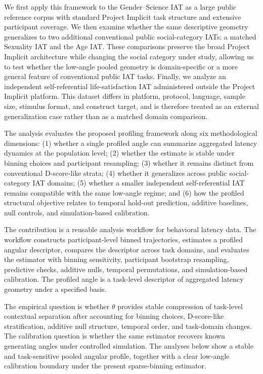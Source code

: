 \documentclass[12pt]{article}
\begin{document}
We first apply this framework to the Gender--Science IAT as a large public reference corpus with standard Project Implicit task structure and extensive participant coverage. We then examine whether the same descriptive geometry generalizes to two additional conventional public social-category IATs: a matched Sexuality IAT and the Age IAT. These comparisons preserve the broad Project Implicit architecture while changing the social category under study, allowing us to test whether the low-angle pooled geometry is domain-specific or a more general feature of conventional public IAT tasks. Finally, we analyze an independent self-referential life-satisfaction IAT administered outside the Project Implicit platform. This dataset differs in platform, protocol, language, sample size, stimulus format, and construct target, and is therefore treated as an external generalization case rather than as a matched domain comparison.

The analysis evaluates the proposed profiling framework along six methodological dimensions: (1) whether a single profiled angle can summarize aggregated latency dynamics at the population level; (2) whether the estimate is stable under binning choices and participant resampling; (3) whether it remains distinct from conventional D-score-like strata; (4) whether it generalizes across public social-category IAT domains; (5) whether a smaller independent self-referential IAT remains compatible with the same low-angle regime; and (6) how the profiled structural objective relates to temporal hold-out prediction, additive baselines, null controls, and simulation-based calibration.

The contribution is a reusable analysis workflow for behavioral latency data. The workflow constructs participant-level binned trajectories, estimates a profiled angular descriptor, compares the descriptor across task domains, and evaluates the estimator with binning sensitivity, participant bootstrap resampling, predictive checks, additive nulls, temporal permutations, and simulation-based calibration. The profiled angle is a task-level descriptor of aggregated latency geometry under a specified basis.

The empirical question is whether \(\theta\) provides stable compression of task-level contextual separation after accounting for binning choices, D-score-like stratification, additive null structure, temporal order, and task-domain changes. The calibration question is whether the same estimator recovers known generating angles under controlled simulation. The analyses below show a stable and task-sensitive pooled angular profile, together with a clear low-angle calibration boundary under the present sparse-binning estimator.
\end{document}
